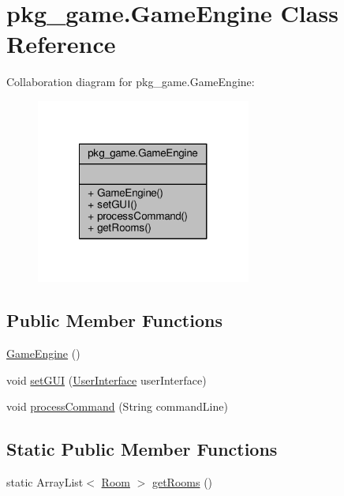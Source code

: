\hypertarget{classpkg__game_1_1GameEngine}{\section{pkg\-\_\-game.\-Game\-Engine Class Reference}
\label{classpkg__game_1_1GameEngine}
}


Collaboration diagram for pkg\-\_\-game.\-Game\-Engine\-:
\nopagebreak
\begin{figure}[H]
\begin{center}
\leavevmode
\includegraphics[width=200pt]{classpkg__game_1_1GameEngine__coll__graph}
\end{center}
\end{figure}
\subsection*{Public Member Functions}
\begin{DoxyCompactItemize}
\item 
\hyperlink{classpkg__game_1_1GameEngine_a6b6494f73d268d0c394d819c8425f1d5}{Game\-Engine} ()
\item 
void \hyperlink{classpkg__game_1_1GameEngine_a0156eb9ee85fc086aef4da8594fb2891}{set\-G\-U\-I} (\hyperlink{classpkg__game_1_1UserInterface}{User\-Interface} user\-Interface)
\item 
void \hyperlink{classpkg__game_1_1GameEngine_a37887ae202eadba82495da82ac4e1908}{process\-Command} (String command\-Line)
\end{DoxyCompactItemize}
\subsection*{Static Public Member Functions}
\begin{DoxyCompactItemize}
\item 
static Array\-List$<$ \hyperlink{classpkg__world_1_1Room}{Room} $>$ \hyperlink{classpkg__game_1_1GameEngine_ae838a102ca62ef2bfd2e9d2d5ae98214}{get\-Rooms} ()
\end{DoxyCompactItemize}


